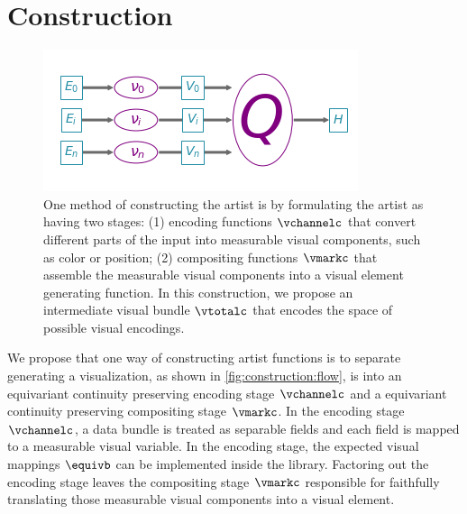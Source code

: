 \documentclass[10pt,journal,compsoc]{IEEEtran}
\theoremstyle{definition}
\theoremstyle{remark}
\begin{document}
\section{Construction}
\label{sec:construction}
\begin{figure}[h!]
  \label{fig:construction:flow}
  \includegraphics*[width=1\columnwidth]{path_of_q.png}
  \caption{One method of constructing the artist is by formulating the artist as having two stages: (1) encoding functions $\vchannelc$ that convert different parts of the input into measurable visual components, such as color or position; (2) compositing functions $\vmarkc$ that assemble the measurable visual components into a visual element generating function. In this construction, we propose an intermediate visual bundle $\vtotalc$ that encodes the space of possible visual encodings.}
\end{figure}
We propose that one way of constructing artist functions is to separate generating a visualization, as shown in \autoref{fig:construction:flow}, is into an equivariant continuity preserving encoding stage $\vchannelc$ and a equivariant continuity preserving compositing stage $\vmarkc$. In the \textcolor{artist}{encoding} stage $\vchannelc$, a data bundle is treated as separable fields and each field is mapped to a measurable visual variable. In the encoding stage, the expected visual mappings $\equivb$ can be implemented inside the library. Factoring out the encoding stage leaves the \textcolor{artist}{compositing} stage $\vmarkc$ responsible for faithfully translating those measurable visual components into a visual element.  
\end{document}
